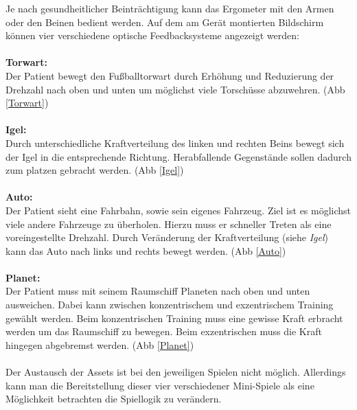 			Je nach gesundheitlicher Beinträchtigung kann das Ergometer mit den Armen oder den Beinen bedient 					werden. Auf dem am Gerät montierten Bildschirm können vier verschiedene optische Feedbacksysteme 					angezeigt werden:
			\\ \\
			\textbf{Torwart:}\\
				Der Patient bewegt den Fußballtorwart durch Erhöhung und Reduzierung der Drehzahl nach oben und unten 					um möglichst viele Torschüsse abzuwehren. (Abb \ref{Torwart})
			\\ \\
			\textbf{Igel:} \\
				Durch unterschiedliche Kraftverteilung des linken und rechten Beins bewegt sich der Igel in die 						entsprechende Richtung. Herabfallende Gegenstände sollen dadurch zum platzen gebracht werden. 					(Abb \ref{Igel})
			\\ \\
			\textbf{Auto:}\\
				Der Patient sieht eine Fahrbahn, sowie sein eigenes Fahrzeug. Ziel ist es möglichst viele andere 						Fahrzeuge zu überholen. Hierzu muss er schneller Treten als eine voreingestellte Drehzahl. Durch 						Veränderung der Kraftverteilung (siehe \textit{Igel}) kann das Auto nach links und rechts bewegt werden. (Abb \ref{Auto})
			\\ \\
			\textbf{Planet:}\\
				Der Patient muss mit seinem Raumschiff Planeten nach oben und unten ausweichen. Dabei kann 						zwischen konzentrischem und exzentrischem Training gewählt werden. Beim konzentrischen Training 					muss eine gewisse Kraft erbracht werden um das Raumschiff zu bewegen. Beim exzentrischen muss 					die Kraft hingegen abgebremst werden. (Abb \ref{Planet})
\\ \\			
			Der Austausch der Assets ist bei den jeweiligen Spielen nicht möglich. Allerdings kann man die Bereitstellung 				dieser vier verschiedener Mini-Spiele als eine Möglichkeit betrachten die Spiellogik zu verändern.
